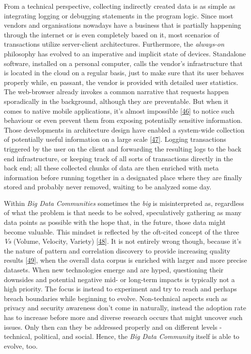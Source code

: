 \documentclass[12pt,english,a4paper,titlepage,cleardoublepage=empty,dottedtoc]{report}
\begin{document}
From a technical perspective, collecting indirectly created data is as
simple as integrating logging or debugging statements in the program
logic. Since most vendors and organisations nowadays have a business
that is partially happening through the internet or is even completely
based on it, most scenarios of transactions utilize server-client
architectures. Furthermore, the \emph{always-on} philosophy has evolved
to an imperative and implicit state of devices. Standalone software,
installed on a personal computer, calls the vendor's infrastructure that
is located in the cloud on a regular basis, just to make sure that its
user behaves properly while, en passant, the vendor is provided with
detailed user statistics. The web-browser already invokes a common
narrative that requests happen sporadically in the background, although
they are preventable. But when it comes to native mobile applications,
it's almost impossible
{[}\protect\hyperlink{ref-web_2016_answers-io}{46}{]} to notice such
behaviour or even prevent them from exposing potentially sensitive
information. Those developments in architecture design have enabled a
system-wide collection of potentially useful information on a large
scale
{[}\protect\hyperlink{ref-web_2016_big-data-enthusiasts-should-not-ignore}{47}{]}.
Logging transactions triggered by the user on the client and forwarding
the resulting logs to the back end infrastructure, or keeping track of
all sorts of transactions directly in the back end; all these collected
chunks of data are then enriched with meta information before running
together in a designated place where they are finally stored and
probably never removed, waiting to be analyzed some day.

Within \emph{Big Data Communities} sometimes the \emph{big} is
misinterpreted as, regardless of what the problem is that needs to be
solved, speculatively gathering as many data points as possible with the
hope that, in the future, those data might become valuable. This mindset
is reflected by the oft-cited concept of the three \emph{Vs} (Volume,
Velocity, Variety)
{[}\protect\hyperlink{ref-report_2001_3d-data-management-controlling-data-volume-velocity-and-variety}{48}{]}.
It is not entirely wrong though, because it's the nature of pattern and
correlation discovery to provide increasing quality results
{[}\protect\hyperlink{ref-paper_2015_big-data-for-development-a-review-of-promises-and-challenges:more-data}{49}{]},
when the overall data corpus is enriched with larger and more precise
datasets. When new technologies emerge and are hyped, questioning their
downsides and potential negative mid- or long-term impacts is typically
not a high priority. The focus is instead to experiment and try to reach
and perhaps breach boundaries while beginning to evolve. Non-technical
aspects such as privacy and security awareness don't come in naturally,
instead the adoption rate has to increase before more and diverse
research occurs that might uncover such issues. Only then can they be
addressed properly and on different levels - technical, political, and
social. Hence, the \emph{Big Data Community} itself is able to evolve,
too.
\end{document}
